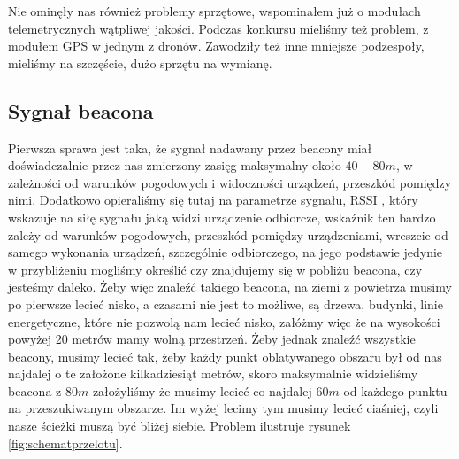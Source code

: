 Nie ominęły nas również problemy sprzętowe, wspominałem już o modułach telemetrycznych wątpliwej jakości. Podczas konkursu mieliśmy też problem, z modułem GPS w jednym z dronów. Zawodziły też inne mniejsze podzespoły, mieliśmy na szczęście, dużo sprzętu na wymianę.

\subsection{Sygnał beacona}

Pierwsza sprawa jest taka, że sygnał nadawany przez beacony miał doświadczalnie przez nas zmierzony zasięg maksymalny około $40-80 m$, w zależności od warunków pogodowych i widoczności urządzeń, przeszkód pomiędzy nimi. Dodatkowo opieraliśmy się tutaj na parametrze sygnału, RSSI \cite{rssi}, który wskazuje na siłę sygnału jaką widzi urządzenie odbiorcze, wskaźnik ten bardzo zależy od warunków pogodowych, przeszkód pomiędzy urządzeniami, wreszcie od samego wykonania urządzeń, szczególnie odbiorczego, na jego podstawie jedynie w przybliżeniu mogliśmy określić czy znajdujemy się w pobliżu beacona, czy jesteśmy daleko. Żeby więc znaleźć takiego beacona, na ziemi z powietrza musimy po pierwsze lecieć nisko, a czasami nie jest to możliwe, są drzewa, budynki, linie energetyczne, które nie pozwolą nam lecieć nisko, załóżmy więc że na wysokości powyżej 20 metrów mamy wolną przestrzeń. Żeby jednak znaleźć wszystkie beacony, musimy lecieć tak, żeby każdy punkt oblatywanego obszaru był od nas najdalej o te założone kilkadziesiąt metrów, skoro maksymalnie widzieliśmy beacona z $80 m$ założyliśmy że musimy lecieć co najdalej $60 m$ od każdego punktu na przeszukiwanym obszarze. Im wyżej lecimy tym musimy lecieć ciaśniej, czyli nasze ścieżki muszą być bliżej siebie. Problem ilustruje rysunek \ref{fig:schematprzelotu}.

